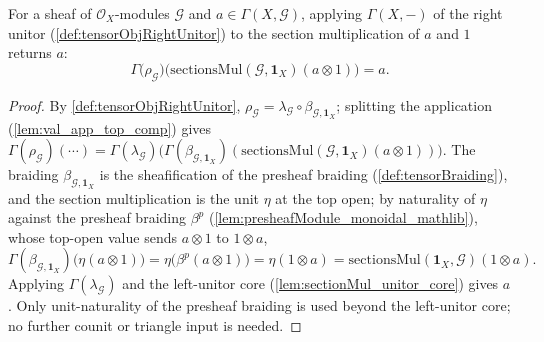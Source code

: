 \begin{lemma}
  \label{lem:sectionMul_rightUnitor_core}
  For a sheaf of \(\mathcal{O}_X\)-modules \(\mathcal{G}\) and
  \(a \in \Gamma(X, \mathcal{G})\), applying \(\Gamma(X,-)\) of the right unitor
  (\cref{def:tensorObjRightUnitor}) to the section multiplication of \(a\) and
  \(1\) returns \(a\):
  \[
    \Gamma\bigl(\rho_{\mathcal{G}}\bigr)
      \bigl( \mathrm{sectionsMul}(\mathcal{G}, \mathbf{1}_X)(a \otimes 1) \bigr)
      = a .
  \]
\end{lemma}

\begin{proof}
  By \cref{def:tensorObjRightUnitor},
  \(\rho_{\mathcal{G}} = \lambda_{\mathcal{G}} \circ
  \beta_{\mathcal{G},\mathbf{1}_X}\); splitting the application
  (\cref{lem:val_app_top_comp}) gives
  \(\Gamma(\rho_{\mathcal{G}})(\cdots) =
  \Gamma(\lambda_{\mathcal{G}})\bigl(\Gamma(\beta_{\mathcal{G},\mathbf{1}_X})
  (\mathrm{sectionsMul}(\mathcal{G},\mathbf{1}_X)(a \otimes 1))\bigr)\). The
  braiding \(\beta_{\mathcal{G},\mathbf{1}_X}\) is the sheafification of the
  presheaf braiding (\cref{def:tensorBraiding}), and the section multiplication is
  the unit \(\eta\) at the top open; by naturality of \(\eta\) against the
  presheaf braiding \(\beta^p\) (\cref{lem:presheafModule_monoidal_mathlib}), whose
  top-open value sends \(a \otimes 1\) to \(1 \otimes a\),
  \[
    \Gamma(\beta_{\mathcal{G},\mathbf{1}_X})
      \bigl(\eta(a \otimes 1)\bigr)
      = \eta\bigl(\beta^p(a \otimes 1)\bigr) = \eta(1 \otimes a)
      = \mathrm{sectionsMul}(\mathbf{1}_X, \mathcal{G})(1 \otimes a) .
  \]
  Applying \(\Gamma(\lambda_{\mathcal{G}})\) and the left-unitor core
  (\cref{lem:sectionMul_unitor_core}) gives \(a\). Only unit-naturality of the
  presheaf braiding is used beyond the left-unitor core; no further counit or
  triangle input is needed.
\end{proof}

